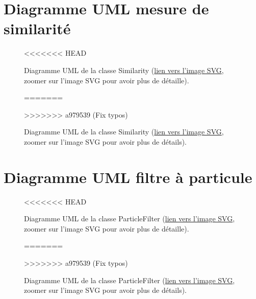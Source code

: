 \begin{appendices}
\clearpage
\section*{Diagramme UML mesure de similarité}\label{app:UMLSimilarity}
\begin{figure}[!htbp]
	\center
<<<<<<< HEAD
	\caption{Diagramme UML de la classe Similarity (\href{https://raw.githubusercontent.com/gabriel-combe/Cuttlefish_Tracker/main/rapport/UML/similarity.svg}{lien vers l'image SVG}, zoomer sur l'image SVG pour avoir plus de détaille).}
=======
	\caption{Diagramme UML de la classe Similarity (\href{https://raw.githubusercontent.com/gabriel-combe/Cuttlefish_Tracker/main/rapport/UML/similarity.svg}{lien vers l'image SVG}, zoomer sur l'image SVG pour avoir plus de détails).}
>>>>>>> a979539 (Fix typos)
	\label{fig:uml_diagram_similarity}
\end{figure}
\FloatBarrier


\clearpage
\section*{Diagramme UML filtre à particule}\label{app:UMLParticleFilter}
\begin{figure}[!htbp]
	\center
<<<<<<< HEAD
	\caption{Diagramme UML de la classe ParticleFilter (\href{https://raw.githubusercontent.com/gabriel-combe/Cuttlefish_Tracker/main/rapport/UML/particlefilter.svg}{lien vers l'image SVG}, zoomer sur l'image SVG pour avoir plus de détaille).}
=======
	\caption{Diagramme UML de la classe ParticleFilter (\href{https://raw.githubusercontent.com/gabriel-combe/Cuttlefish_Tracker/main/rapport/UML/particlefilter.svg}{lien vers l'image SVG}, zoomer sur l'image SVG pour avoir plus de détails).}
>>>>>>> a979539 (Fix typos)
	\label{fig:uml_diagram_particlefilter}
\end{figure}
\FloatBarrier
	
	
\clearpage

\end{appendices}
